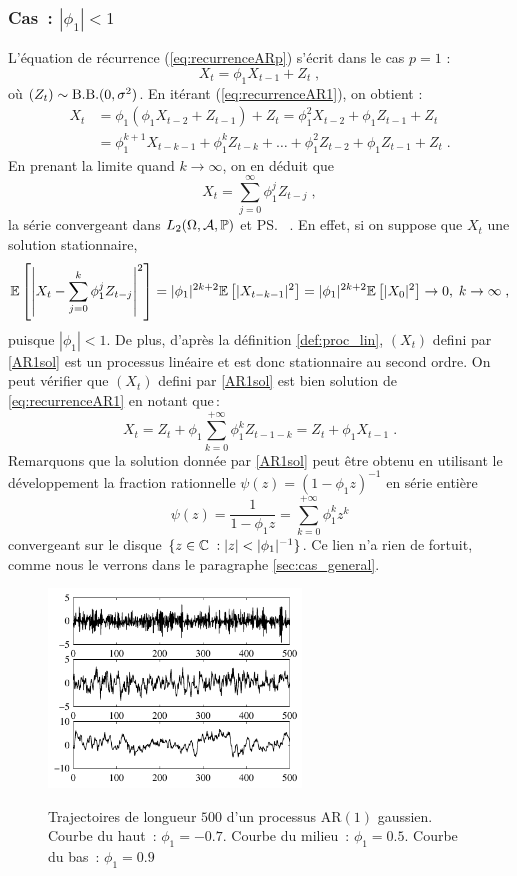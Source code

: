 \subsubsection{Cas~: $|\phi_1| < 1$}
L'\'equation de r\'ecurrence (\ref{eq:recurrenceARp}) s'\'ecrit dans le cas $p=1$ :
\begin{equation}
\label{eq:recurrenceAR1}
        X_{t} = \phi_1 X_{t-1} + Z_{t}\;,
\end{equation}
o\`u $(Z_t)\sim\mathrm{B.B.}(0,\sigma^2)$. En it\'erant (\ref{eq:recurrenceAR1}),
on obtient :
\begin{align*}
X_t&=\phi_1(\phi_1 X_{t-2}+Z_{t-1})+Z_t=\phi_1^2 X_{t-2}+\phi_1 Z_{t-1}+Z_t\\
&=\phi_1^{k+1} X_{t-k-1}+\phi_1^k Z_{t-k}+\dots+\phi_1^2 Z_{t-2}+\phi_1 Z_{t-1}
+Z_t\;.
\end{align*}
En prenant la limite quand $k \to \infty$, on en d\'eduit que
\begin{equation}\label{AR1sol}
X_t=\sum_{j=0}^{\infty}\phi_1^j Z_{t-j}\;,
\end{equation}
la s\'erie convergeant dans $L_2(\Omega,\mathcal{A},\mathbb{P})$ et \ps\ .
En effet, si on suppose que $X_t$ une solution stationnaire,
$$
{\mathbb E}\left[ \left|X_t-\sum_{j=0}^{k}\phi_1^j Z_{t-j}\right|^2 \right]
=|\phi_1|^{2k+2} {\mathbb E}\left[ |X_{t-k-1}|^2 \right]=|\phi_1|^{2k+2} {\mathbb E}\left[ |X_0|^2 \right]\to 0,\;
k\to\infty\;,
$$
puisque $|\phi_1| < 1$. De plus, d'apr\`es la d\'efinition \ref{def:proc_lin}, $(X_t)$
defini par \eqref{AR1sol} est un processus lin\'eaire et est donc stationnaire
au second ordre. On peut v\'erifier que $(X_t)$
defini par \eqref{AR1sol} est bien solution de \eqref{eq:recurrenceAR1}
en notant que\,:
\[
  X_t = Z_t + \phi_1 \sum_{k=0}^{+\infty} \phi_1^k Z_{t-1-k}
      = Z_t + \phi_1 X_{t-1}\;.
\]
Remarquons que la solution donn\'ee par \eqref{AR1sol} peut \^{e}tre obtenu
en utilisant le d\'eveloppement la fraction rationnelle $\psi(z)=(1-\phi_1
z)^{-1}$ en s\'erie enti\`ere
\[
  \psi(z)=\frac{1}{1-\phi_1 z} = \sum_{k=0}^{+\infty} \phi_1^k z^k
\]
convergeant sur le disque $\{ z \in \mathbb{C} \;: |z| < |\phi_1|^{-1}\}$.
Ce lien n'a rien de fortuit, comme nous le verrons  dans le paragraphe \ref{sec:cas_general}.
\begin{figure}
\centering
  \includegraphics[width=0.6\textwidth]{Figures/chronoar1}\\
  \caption{Trajectoires de longueur $500$ d'un processus AR$(1)$ gaussien.
 Courbe du haut~: $\phi_1=-0.7$.
 Courbe du milieu~: $\phi_1=0.5$.
 Courbe du bas~: $\phi_1=0.9$}
 \label{fig:figar1}
\end{figure}

